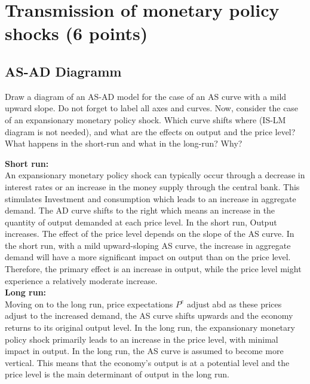 \documentclass[a4paper,11pt]{article}
\begin{document}
\section{Transmission of monetary policy shocks (6 points)}
\begin{qbox}{\subsection{AS-AD Diagramm}}
Draw a diagram of an AS-AD model for the case of an AS curve with a mild upward slope. Do not forget to label all axes and curves. Now, consider the case of an expansionary monetary policy shock. Which curve shifts where (IS-LM diagram is not needed), and what are the effects on output and the price level? What happens in the short-run and what in the long-run? Why?
\end{qbox}
\textbf{Short run:}\\
 
An expansionary monetary policy shock can typically occur through a decrease in interest rates or an increase in the money supply through the central bank. This stimulates Investment and consumption which leads to an increase in aggregate demand. The AD curve shifts to the right which means an increase in the quantity of output demanded at each price level. In the short run, Output increases. The effect of the price level depends on the slope of the AS curve. In the short run, with a mild upward-sloping AS curve, the increase in aggregate demand will have a more significant impact on output than on the price level. Therefore, the primary effect is an increase in output, while the price level might experience a relatively moderate increase. \\

\textbf{Long run:} \\

Moving on to the long run, price expectations $P^e$ adjust abd as these prices adjust to the increased demand, the AS curve shifts upwards and the economy returns to its original output level. In the long run, the expansionary monetary policy shock primarily leads to an increase in the price level, with minimal impact in output. In the long run, the AS curve is assumed to become more vertical. This means that the economy's output is at a potential level and the price level is the main determinant of output in the long run. \\
\end{document}
